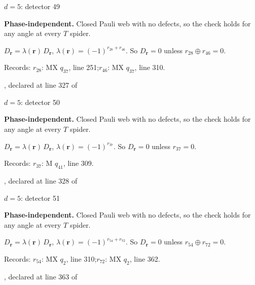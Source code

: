 \label{d5_det049}
{\Large $d=5$: detector 49}\par
\textbf{Phase-independent.} Closed Pauli web with no defects, so the check holds for any angle at every $T$ spider.
\begin{center}
\end{center}
\vspace{-1mm}
$D_{\boldsymbol r}=\lambda(\boldsymbol r)\,D_{\boldsymbol r}$, \quad $\lambda(\boldsymbol r)=(-1)^{r_{28}+r_{46}}$. \qquad So $D_{\boldsymbol r}=0$ unless $r_{28}\oplus r_{46}=0$.
\par\smallskip\begin{minipage}{.98\linewidth}\small Records: $r_{28}$: MX $q_{37}$, line 251;\quad $r_{46}$: MX $q_{37}$, line 310.\end{minipage}
\vfill
{\footnotesize\texttt{}, declared at line 327 of \texttt{}}
\newpage

\label{d5_det050}
{\Large $d=5$: detector 50}\par
\textbf{Phase-independent.} Closed Pauli web with no defects, so the check holds for any angle at every $T$ spider.
\begin{center}
\end{center}
\vspace{-1mm}
$D_{\boldsymbol r}=\lambda(\boldsymbol r)\,D_{\boldsymbol r}$, \quad $\lambda(\boldsymbol r)=(-1)^{r_{37}}$. \qquad So $D_{\boldsymbol r}=0$ unless $r_{37}=0$.
\par\smallskip\begin{minipage}{.98\linewidth}\small Records: $r_{37}$: M $q_{41}$, line 309.\end{minipage}
\vfill
{\footnotesize\texttt{}, declared at line 328 of \texttt{}}
\newpage

\label{d5_det051}
{\Large $d=5$: detector 51}\par
\textbf{Phase-independent.} Closed Pauli web with no defects, so the check holds for any angle at every $T$ spider.
\begin{center}
\end{center}
\vspace{-1mm}
$D_{\boldsymbol r}=\lambda(\boldsymbol r)\,D_{\boldsymbol r}$, \quad $\lambda(\boldsymbol r)=(-1)^{r_{54}+r_{72}}$. \qquad So $D_{\boldsymbol r}=0$ unless $r_{54}\oplus r_{72}=0$.
\par\smallskip\begin{minipage}{.98\linewidth}\small Records: $r_{54}$: MX $q_{2}$, line 310;\quad $r_{72}$: MX $q_{2}$, line 362.\end{minipage}
\vfill
{\footnotesize\texttt{}, declared at line 363 of \texttt{}}
\newpage

